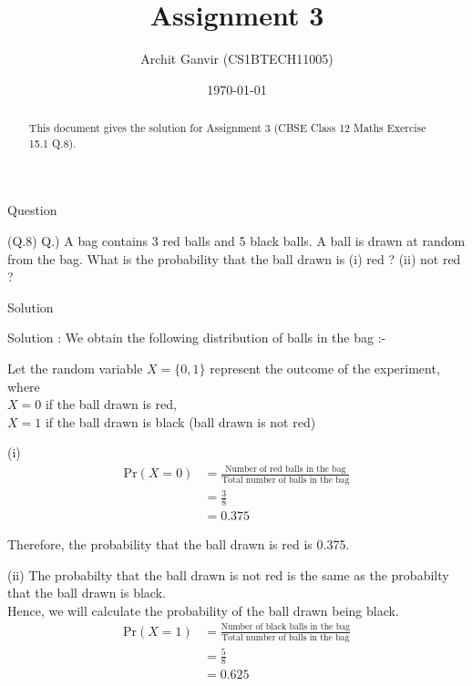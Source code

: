 \documentclass{beamer}
\title{Assignment 3}
\author{Archit Ganvir (CS1BTECH11005)}
\date{\today}
\begin{document}
\begin{frame}

\titlepage

\begin{abstract}
This document gives the solution for Assignment 3 (CBSE Class 12 Maths Exercise 15.1 Q.8).
\end{abstract}

\end{frame}

\logo{}

\begin{frame}{Question}

(Q.8) Q.) A bag contains 3 red balls and 5 black balls. A ball is drawn at random from the bag. What is the probability that the ball drawn is (i) red ? (ii) not red ?

\end{frame}

\begin{frame}{Solution}

Solution : We obtain the following distribution of balls in the bag :-
\begin{table}[ht!]
	
\caption{}
\label{table:table1}

Let the random variable $X = \{0,1\}$ represent the outcome of the experiment, where\\
$X = 0$ if the ball drawn is red,\\
$X = 1$ if the ball drawn is black (ball drawn is not red)
	
\end{table}

\end{frame}

\begin{frame}

(i)
\begin{align}
\text{Pr} (X = 0) &= \frac{\text{Number of red balls in the bag}}{\text{Total number of balls in the bag}} \\
&= \frac{3}{8} \\
&= 0.375
\end{align}

Therefore, the probability that the ball drawn is red is 0.375.

\end{frame}

\begin{frame}

(ii) The probabilty that the ball drawn is not red is the same as the probabilty that the ball drawn is black.\\
Hence, we will calculate the probability of the ball drawn being black.\\

\begin{align}
\text{Pr} (X = 1) &= \frac{\text{Number of black balls in the bag}}{\text{Total number of balls in the bag}} \\
&= \frac{5}{8} \\
&= 0.625
\end{align}

\end{frame}
\end{document}
